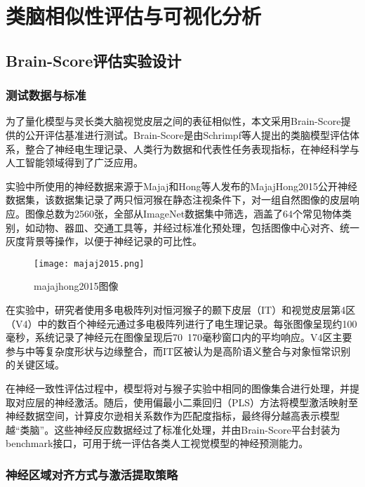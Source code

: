 \chapter{类脑相似性评估与可视化分析}

\section{Brain-Score评估实验设计}

\subsection{测试数据与标准}

为了量化模型与灵长类大脑视觉皮层之间的表征相似性，本文采用Brain-Score提供的公开评估基准进行测试。Brain-Score是由Schrimpf等人提出的类脑模型评估体系，整合了神经电生理记录、人类行为数据和代表性任务表现指标，在神经科学与人工智能领域得到了广泛应用\cite{schrimpf2018brain}。

实验中所使用的神经数据来源于Majaj和Hong等人发布的MajajHong2015公开神经数据集，该数据集记录了两只恒河猴在静态注视条件下，对一组自然图像的皮层响应。图像总数为2560张，全部从ImageNet数据集中筛选，涵盖了64个常见物体类别，如动物、器皿、交通工具等，并经过标准化预处理，包括图像中心对齐、统一灰度背景等操作，以便于神经记录的可比性\cite{majaj2015simple}。

\begin{figure}[hbt]
	\centering
	\texttt{[image: majaj2015.png]}
	\caption{majajhong2015图像}
	\label{f.majajhong}
\end{figure}

在实验中，研究者使用多电极阵列对恒河猴子的颞下皮层（IT）和视觉皮层第4区（V4）中的数百个神经元通过多电极阵列进行了电生理记录。每张图像呈现约100毫秒，系统记录了神经元在图像呈现后70~170毫秒窗口内的平均响应。V4区主要参与中等复杂度形状与边缘整合，而IT区被认为是高阶语义整合与对象恒常识别的关键区域\cite{dicarlo2012does}。

在神经一致性评估过程中，模型将对与猴子实验中相同的图像集合进行处理，并提取对应层的神经激活。随后，使用偏最小二乘回归（PLS）方法将模型激活映射至神经数据空间，计算皮尔逊相关系数作为匹配度指标，最终得分越高表示模型越“类脑”。这些神经反应数据经过了标准化处理，并由Brain-Score平台封装为benchmark接口，可用于统一评估各类人工视觉模型的神经预测能力。

\subsection{神经区域对齐方式与激活提取策略}

